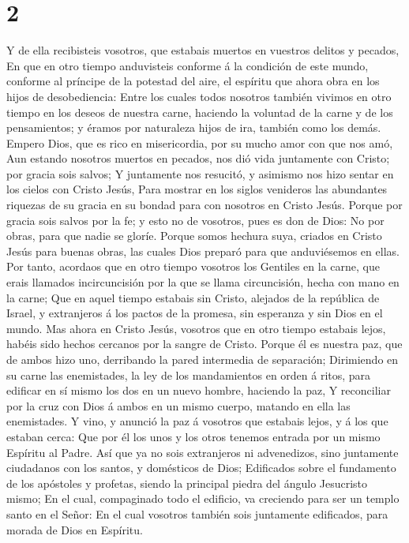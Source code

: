 \hypertarget{section-1}{%
\section{2}\label{section-1}}

 Y de ella recibisteis vosotros, que estabais muertos en
vuestros delitos y pecados,  En que en otro tiempo
anduvisteis conforme á la condición de este mundo, conforme al príncipe
de la potestad del aire, el espíritu que ahora obra en los hijos de
desobediencia:  Entre los cuales todos nosotros también
vivimos en otro tiempo en los deseos de nuestra carne, haciendo la
voluntad de la carne y de los pensamientos; y éramos por naturaleza
hijos de ira, también como los demás.  Empero Dios, que es
rico en misericordia, por su mucho amor con que nos amó, 
Aun estando nosotros muertos en pecados, nos dió vida juntamente con
Cristo; por gracia sois salvos;  Y juntamente nos
resucitó, y asimismo nos hizo sentar en los cielos con Cristo Jesús,
 Para mostrar en los siglos venideros las abundantes
riquezas de su gracia en su bondad para con nosotros en Cristo Jesús.
 Porque por gracia sois salvos por la fe; y esto no de
vosotros, pues es don de Dios:  No por obras, para que
nadie se gloríe.  Porque somos hechura suya, criados en
Cristo Jesús para buenas obras, las cuales Dios preparó para que
anduviésemos en ellas.  Por tanto, acordaos que en otro
tiempo vosotros los Gentiles en la carne, que erais llamados
incircuncisión por la que se llama circuncisión, hecha con mano en la
carne;  Que en aquel tiempo estabais sin Cristo, alejados
de la república de Israel, y extranjeros á los pactos de la promesa, sin
esperanza y sin Dios en el mundo.  Mas ahora en Cristo
Jesús, vosotros que en otro tiempo estabais lejos, habéis sido hechos
cercanos por la sangre de Cristo.  Porque él es nuestra
paz, que de ambos hizo uno, derribando la pared intermedia de
separación;  Dirimiendo en su carne las enemistades, la
ley de los mandamientos en orden á ritos, para edificar en sí mismo los
dos en un nuevo hombre, haciendo la paz,  Y reconciliar
por la cruz con Dios á ambos en un mismo cuerpo, matando en ella las
enemistades.  Y vino, y anunció la paz á vosotros que
estabais lejos, y á los que estaban cerca:  Que por él
los unos y los otros tenemos entrada por un mismo Espíritu al Padre.
 Así que ya no sois extranjeros ni advenedizos, sino
juntamente ciudadanos con los santos, y domésticos de Dios;
 Edificados sobre el fundamento de los apóstoles y
profetas, siendo la principal piedra del ángulo Jesucristo mismo;
 En el cual, compaginado todo el edificio, va creciendo
para ser un templo santo en el Señor:  En el cual
vosotros también sois juntamente edificados, para morada de Dios en
Espíritu.

